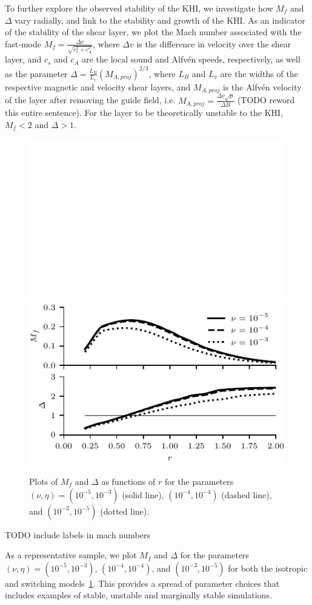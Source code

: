 To further explore the observed stability of the KHI, we investigate how $M_f$ and $\Delta$ vary radially, and link to the stability and growth of the KHI. As an indicator of the stability of the shear layer, we plot the Mach number associated with the fast-mode $M_f = \frac{\Delta v}{\sqrt{c_s^2 + c_A^2}}$, where $\Delta v$ is the difference in velocity over the shear layer, and $c_s$ and $c_A$ are the local sound and Alfv\'en speeds, respectively, as well as the parameter $\Delta = \frac{L_B}{L_v}(M_{A, proj})^{2/3}$, where $L_B$ and $L_v$ are the widths of the respective magnetic and velocity shear layers, and $M_{A, proj}$ is the Alfv\'en velocity of the layer after removing the guide field, i.e. $M_{A, proj} = \frac{\Delta v \sqrt{\rho}}{\Delta B}$ (TODO reword this entire sentence). For the layer to be theoretically unstable to the KHI, $M_f < 2$ and $\Delta > 1$.

\begin{figure}[h]
  \centering
  \includegraphics[width=0.45\linewidth]{param_study/mach_numbers_iso.pdf}
  \includegraphics[width=0.45\linewidth]{param_study/mach_numbers_swi.pdf}
  \caption{Plots of $M_f$ and $\Delta$ as functions of $r$ for the parameters $(\nu, \eta) = (10^{-5}, 10^{-3})$ (solid line), $(10^{-4}, 10^{-4})$ (dashed line), and $(10^{-3}, 10^{-5})$ (dotted line).}%
  \label{fig:mach_numbers}
\end{figure}

TODO include labels in mach numbers

As a representative sample, we plot $M_f$ and $\Delta$ for the parameters $(\nu, \eta) = (10^{-5}, 10^{-3})$, $(10^{-4}, 10^{-4})$, and $(10^{-3}, 10^{-5})$ for both the isotropic and switching models~\ref{fig:mach_numbers}. This provides a spread of parameter choices that includes examples of stable, unstable and marginally stable simulations.

